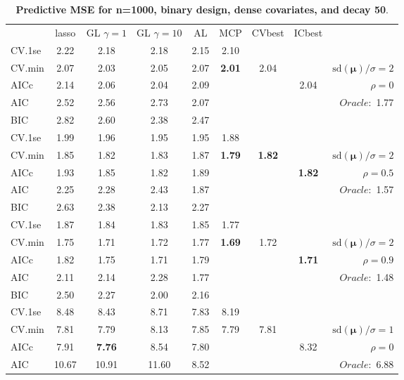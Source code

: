 \begin{table}\vspace{-.5cm}
\caption[l]{ { \bf Predictive MSE for n=1000, binary design, 
dense covariates, and  decay  50}.}
\vspace{-.5cm}
\footnotesize{}
\begin{center}
\begin{tabular}{l*{7}{c}|r}
 & lasso & GL $\gamma=1$ & GL $\gamma=10$ & AL & MCP  & CVbest & ICbest  \\
\cline{1-9}
CV.1se & 2.22 & 2.18 & 2.18 & 2.15 & 2.10 & & & \\
CV.min & 2.07 & 2.03 & 2.05 & 2.07 & {\bf 2.01} & 2.04 & & $\mathrm{sd}(\mathbf{\mu})/\sigma=2$ \\
AICc & 2.14 & 2.06 & 2.04 & 2.09 & & & 2.04 &  $\rho=0$ \\
AIC & 2.52 & 2.56 & 2.73 & 2.07 & & & &  \multirow{2}{*}{$Oracle: $ 1.77} \\
BIC & 2.82 & 2.60 & 2.38 & 2.47 & & & &  \\
 \hline 
CV.1se & 1.99 & 1.96 & 1.95 & 1.95 & 1.88 & & & \\
CV.min & 1.85 & 1.82 & 1.83 & 1.87 & {\bf 1.79} & {\bf 1.82} & & $\mathrm{sd}(\mathbf{\mu})/\sigma=2$ \\
AICc & 1.93 & 1.85 & 1.82 & 1.89 & & & {\bf 1.82} &  $\rho=0.5$ \\
AIC & 2.25 & 2.28 & 2.43 & 1.87 & & & &  \multirow{2}{*}{$Oracle: $ 1.57} \\
BIC & 2.63 & 2.38 & 2.13 & 2.27 & & & &  \\
 \hline 
CV.1se & 1.87 & 1.84 & 1.83 & 1.85 & 1.77 & & & \\
CV.min & 1.75 & 1.71 & 1.72 & 1.77 & {\bf 1.69} & 1.72 & & $\mathrm{sd}(\mathbf{\mu})/\sigma=2$ \\
AICc & 1.82 & 1.75 & 1.71 & 1.79 & & & {\bf 1.71} &  $\rho=0.9$ \\
AIC & 2.11 & 2.14 & 2.28 & 1.77 & & & &  \multirow{2}{*}{$Oracle: $ 1.48} \\
BIC & 2.50 & 2.27 & 2.00 & 2.16 & & & &  \\
 \hline 
CV.1se & 8.48 & 8.43 & 8.71 & 7.83 & 8.19 & & & \\
CV.min & 7.81 & 7.79 & 8.13 & 7.85 & 7.79 & 7.81 & & $\mathrm{sd}(\mathbf{\mu})/\sigma=1$ \\
AICc & 7.91 & {\bf 7.76} & 8.54 & 7.80 & & & 8.32 &  $\rho=0$ \\
AIC & 10.67 & 10.91 & 11.60 & 8.52 & & & &  \multirow{2}{*}{$Oracle: $ 6.88} \\

\end{tabular}
\end{center}
\end{table}
